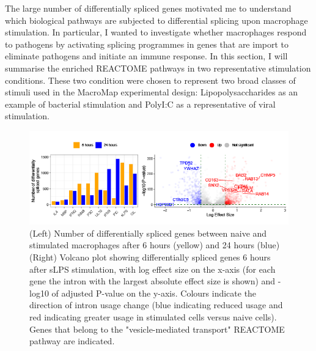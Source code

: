 The large number of differentially spliced genes motivated me to understand which biological pathways are subjected to differential splicing upon macrophage stimulation. In particular, I wanted to investigate whether macrophages respond to pathogens by activating splicing programmes in genes that are import to eliminate pathogens and initiate an immune response. In this section, I will summarise the enriched REACTOME pathways in two representative stimulation conditions. These two condition were chosen to represent two broad classes of stimuli used in the MacroMap experimental design: Lipopolysaccharides as an example of bacterial stimulation and PolyI:C as a representative of viral stimulation.\\




\begin{figure}[H]
  \centering
  \includegraphics[width=\textwidth]{Vector/ds.png}
  \caption[Number of differentially spliced genes and volcano plot of differentially spliced genes in sLPS\_6]{(Left) Number of differentially spliced genes between naive and stimulated macrophages after 6 hours (yellow) and 24 hours (blue) (Right) Volcano plot showing differentially spliced genes 6 hours after sLPS stimulation, with log effect size on the x-axis (for each gene the intron with the largest absolute effect size is shown) and -log10 of adjusted P-value on the y-axis. Colours indicate the direction of intron usage change (blue indicating reduced usage and red indicating greater usage in stimulated cells versus naive cells). Genes that belong to the "vesicle-mediated transport" REACTOME pathway are indicated.}
  \label{fig:ds}   
\end{figure}
